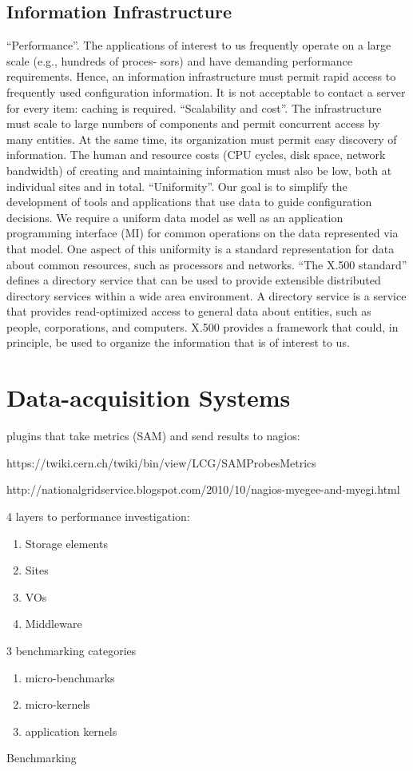 \subsection{Information Infrastructure}
``Performance''.  The applications of interest to us frequently 
operate on  a  large scale  (e.g.,  hundreds  of  proces- 
sors) and have demanding performance requirements. 
Hence, an information infrastructure must permit rapid 
access to frequently used configuration information. It 
is not acceptable to contact  a  server  for every  item: 
caching is required.
``Scalability and cost''. The infrastructure must scale to large
numbers of components and permit concurrent access
by many entities. At the same time, its organization
must permit easy discovery of information. The human
and resource costs (CPU cycles, disk space, network
bandwidth) of creating and maintaining information
must also be low, both at individual sites and in total.
``Uniformity''. Our goal is to simplify the development of
tools and applications that use data to guide configuration
decisions. We require a uniform data model
as well as an application programming interface (MI)
for common operations on the data represented via that
model. One aspect of this uniformity is a standard representation
for data about common resources, such as
processors and networks.
``The X.500 standard'' defines a directory service
that can be used to provide extensible distributed directory
services within a wide area environment. A directory service
is a service that provides read-optimized access to general
data about entities, such as people, corporations, and computers.
X.500 provides a framework that could, in principle,
be used to organize the information that is of interest to us.
\cite{mds1}

\section{Data-acquisition Systems}
plugins that take metrics (SAM) and send results to nagios:

https://twiki.cern.ch/twiki/bin/view/LCG/SAMProbesMetrics

http://nationalgridservice.blogspot.com/2010/10/nagios-myegee-and-myegi.html

4 layers to performance investigation:
\begin{enumerate}
  \item Storage elements
  \item Sites
  \item VOs
  \item Middleware
\end{enumerate}
3 benchmarking categories
\begin{enumerate}
  \item micro-benchmarks
  \item micro-kernels
  \item application kernels
\end{enumerate}
Benchmarking

